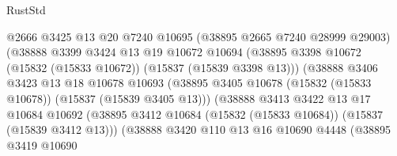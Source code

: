 \begin{lexlean}{RustStd}
\begin{coremodule}
                                    @2666
                                    @3425
                                    @13
                                    @20
                                    @7240
                                    @10695
                                    (@38895 @2665 @7240 @28999 @29003)
                                    (@38888
                                      @3399
                                      @3424
                                      @13
                                      @19
                                      @10672
                                      @10694
                                      (@38895
                                        @3398
                                        @10672
                                        (@15832 (@15833 @10672))
                                        (@15837 (@15839 @3398 @13)))
                                      (@38888
                                        @3406
                                        @3423
                                        @13
                                        @18
                                        @10678
                                        @10693
                                        (@38895
                                          @3405
                                          @10678
                                          (@15832 (@15833 @10678))
                                          (@15837 (@15839 @3405 @13)))
                                        (@38888
                                          @3413
                                          @3422
                                          @13
                                          @17
                                          @10684
                                          @10692
                                          (@38895
                                            @3412
                                            @10684
                                            (@15832 (@15833 @10684))
                                            (@15837 (@15839 @3412 @13)))
                                          (@38888
                                            @3420
                                            @110
                                            @13
                                            @16
                                            @10690
                                            @4448
                                            (@38895
                                              @3419
                                              @10690

\end{coremodule}
\end{lexlean}
